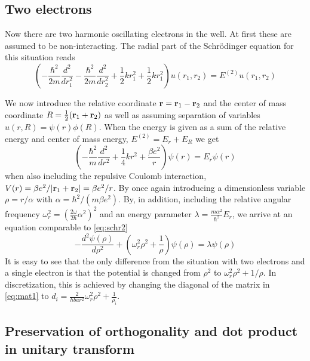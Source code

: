 \documentclass[10pt, a4paper]{amsart}
\begin{document}
\subsection{Two electrons}
Now  there are two harmonic oscillating electrons in the well. At first these are assumed to be non-interacting. The radial part of the Schrödinger equation for this situation reads
\begin{equation}
\left(-\frac{\hbar^2}{2m}\frac{d^2}{dr_1^2} -\frac{\hbar^2}{2m}\frac{d^2}{dr_2^2} +\frac{1}{2}kr_1^2+\frac{1}{2}kr_1^2 \right)u(r_1,r_2)=E^{(2)}u(r_1,r_2)
\end{equation}

We now introduce the relative coordinate $\vb{r} = \vb{r}_1 - \vb{r}_2$ and the center of mass coordinate $R=\frac{1}{2}(\vb{r}_1+\vb{r}_2)$ as well as assuming separation of variables $u(r,R)=\psi(r)\phi(R)$. When the energy is given as a sum of the relative energy and center of mass energy, $E^{(2)}=E_r+E_R$ we get
\begin{equation}
\label{eq:radialschr2}
\left(-\frac{\hbar^2}{m}\frac{d^2}{dr^2}+\frac{1}{4}kr^2+\frac{\beta e^2}{r} \right)\psi(r)=E_r\psi(r)
\end{equation}
when also including the repulsive Coulomb interaction, $V(r) = \beta e^2/\abs{\vb{r}_1+\vb{r}_2}= \beta e^2/r$. By once again introducing a dimensionless variable $\rho=r/\alpha$ with $\alpha=\hbar^2/(m\beta e^2)$. By, in addition, including the relative angular frequency $\omega_r^2=(\frac{2\omega}{2\hbar}\alpha^2)^2$ and an energy parameter $\lambda=\frac{m\alpha^2}{\hbar^2}E_r$, we arrive at an equation comparable to \ref{eq:schr2}
\begin{equation}
-\frac{d^2\psi(\rho)}{d\rho^2}+\left(\omega^2_r\rho^2 + \frac{1}{\rho} \right) \psi(\rho)= \lambda\psi(\rho)
\end{equation}
It is easy to see that the only difference from the situation with two electrons and a single electron is that the potential is changed from $\rho^2$ to $\omega_r^2\rho^2+1/\rho$. In discretization, this is achieved by changing the diagonal of the matrix in \ref{eq:mat1} to $d_i = \frac{2}{hbar^2} \omega_r^2\rho^2+\frac{1}{\rho_i}$.

\subsection{Preservation of orthogonality and dot product in unitary transform}
\end{document}
